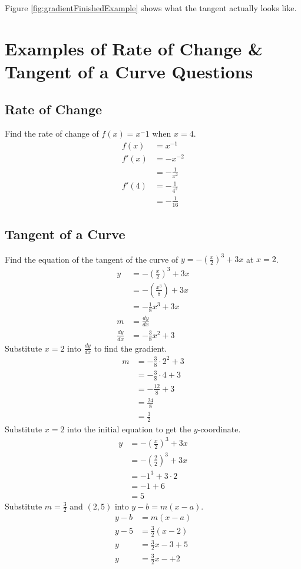 Figure \ref{fig:gradientFinishedExample} shows what the tangent actually looks like.


\section{Examples of Rate of Change \& Tangent of a Curve Questions}
\label{sec:derivativeExamples}
\subsection{Rate of Change}
Find the rate of change of $f(x) = x^-1$ when $x=4$.
\begin{align*}
	f(x) &= x^{-1}\\
	f'(x) &= -x^{-2}\\
	&= -\frac{1}{x^2}\\
	f'(4) &= -\frac{1}{4^2}\\
	&= -\frac{1}{16}
\end{align*}

\subsection{Tangent of a Curve}
Find the equation of the tangent of the curve of $y=-\left(\frac{x}{2}\right)^3+3x$ at $x=2$.
\begin{align*}
	y &= -\left(\frac{x}{2}\right)^3+3x\\
	&= -\left(\frac{x^3}{8}\right)+3x\\
	&= -\frac{1}{8}x^3+3x\\[1.5em]
	m&=\frac{dy}{dx}\\
	\frac{dy}{dx} &= -\frac{3}{8}x^2+3
\end{align*}
Substitute $x=2$ into $\frac{dy}{dx}$ to find the gradient.
\begin{align*}
	m &= -\frac{3}{8} \cdot 2^2+3\\
	&=-\frac{3}{8} \cdot 4 + 3\\
	&=-\frac{12}{8} + 3\\
	&=\frac{24}{8}\\
	&=\frac{3}{2}
\end{align*}
Substitute $x=2$ into the initial equation to get the $y$-coordinate.
\begin{align*}
	y&=-\left(\frac{x}{2}\right)^3+3x\\
	&=-\left(\frac{2}{2}\right)^3+3x\\
	&=-1^3 + 3 \cdot 2\\
	&=-1 + 6\\
	&=5
\end{align*}
Substitute $m=\frac{3}{2}$ and $(2,5)$ into $y-b=m(x-a)$.
\begin{align*}
	y-b&=m(x-a)\\
	y-5&=\frac{3}{2}\left(x-2\right)\\
	y&=\frac{3}{2}x-3+5\\
	y&=\frac{3}{2}x-+2
\end{align*}


